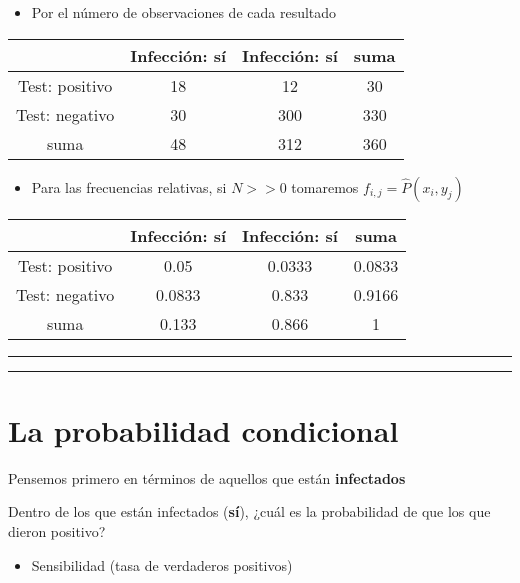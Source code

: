 \documentclass[
]{book}
\providecommand{\tightlist}{%
  \setlength{\itemsep}{0pt}\setlength{\parskip}{0pt}}
\begin{document}
\begin{itemize}
\tightlist
\item
  Por el número de observaciones de cada resultado
\end{itemize}

\begin{longtable}[]{@{}cccc@{}}
\toprule
& Infección: sí & Infección: sí & suma \\
\midrule
\endhead
Test: positivo & 18 & 12 & 30 \\
Test: negativo & 30 & 300 & 330 \\
suma & 48 & 312 & 360 \\
\bottomrule
\end{longtable}

\begin{itemize}
\tightlist
\item
  Para las frecuencias relativas, si \(N>>0\) tomaremos \(f_{i,j}=\hat{P}(x_i, y_j)\)
\end{itemize}

\begin{longtable}[]{@{}cccc@{}}
\toprule
& Infección: sí & Infección: sí & suma \\
\midrule
\endhead
Test: positivo & 0.05 & 0.0333 & 0.0833 \\
Test: negativo & 0.0833 & 0.833 & 0.9166 \\
suma & 0.133 & 0.866 & 1 \\
\bottomrule
\end{longtable}

\begin{center}\rule{0.5\linewidth}{0.5pt}\end{center}

\begin{center}\rule{0.5\linewidth}{0.5pt}\end{center}

\hypertarget{la-probabilidad-condicional}{%
\section{La probabilidad condicional}\label{la-probabilidad-condicional}}

Pensemos primero en términos de aquellos que están \textbf{infectados}

Dentro de los que están infectados (\textbf{sí}), ¿cuál es la probabilidad de que los que dieron positivo?

\begin{itemize}
\tightlist
\item
  Sensibilidad (tasa de verdaderos positivos)
\end{itemize}
\end{document}
